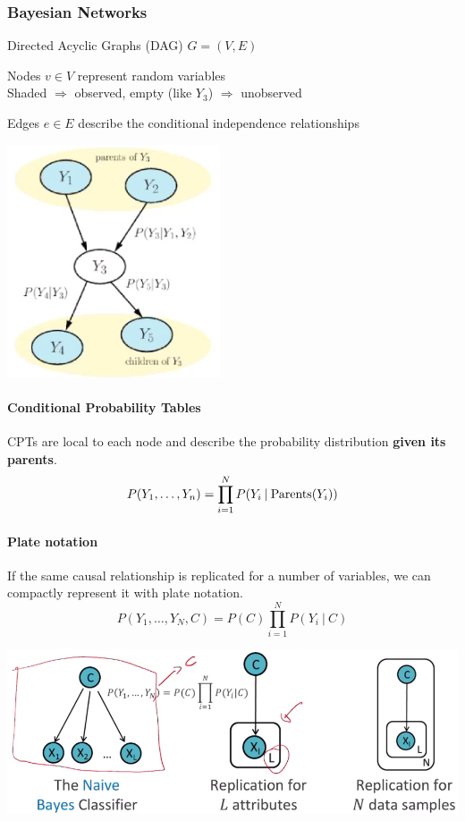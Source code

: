 \documentclass[10pt]{report}
\begin{document}
\subsubsection{Bayesian Networks} 
\begin{multicols}{2}
Directed Acyclic Graphs (DAG) $G = (V,E)$\begin{list}{}{}
	\item Nodes $v\in V$ represent random variables\\
	Shaded $\Rightarrow$ observed, empty (like $Y_3$) $\Rightarrow$ unobserved
	\item Edges $e\in E$ describe the conditional independence relationships
\end{list}
\columnbreak
\begin{center}
	\includegraphics[scale=0.5]{15.png}
\end{center}
\end{multicols}
\paragraph{Conditional Probability Tables} CPTs are local to each node and describe the probability distribution \textbf{given its parents}.
$$P(Y_1,\ldots,Y_n) = \prod_{i=1}^N P(Y_i\:|\:\hbox{Parents}(Y_i))$$
\paragraph{Plate notation} If the same causal relationship is replicated for a number of variables, we can compactly represent it with plate notation.
$$P(Y_1,\ldots,Y_N,C) = P(C)\prod_{i=1}^N P(Y_i\:|\:C)$$
\begin{center}
	\includegraphics[scale=0.5]{16.png}
\end{center}
\end{document}
